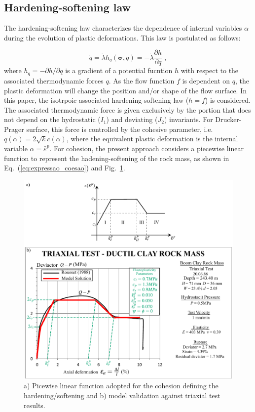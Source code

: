 \documentclass[Journal,letterpaper]{ascelike-new}
\newcommand{\hl}{{h_q}}
\newcommand{\strainpeq}{\bar \varepsilon^p}
\newcommand{\stress}{\boldsymbol{\sigma}}
\begin{document}
\subsection{Hardening-softening law}

The hardening-softening law characterizes the dependence of internal variables $\alpha$ during the evolution of plastic deformations. This law is postulated as follows:

\begin{equation} \label{eq_hardening_law}
	\dot q = \dot \lambda \hl(\stress,q) = - \dot \lambda \dfrac{\partial h}{\partial q}\;,
\end{equation}
where $\hl = -\partial h / \partial q$ is a gradient of a potential fucntion $h$ with respect to the associated thermodynamic forces $q$. As the flow function $f$ is dependent on $q$, the plastic deformation will change the position and/or shape of the flow surface. In this paper, the isotrpoic associated hardening-softening law ($h=f$) is considered. The associated thermodynamic force is given exclusively by the portion that does not depend on the hydrostatic ($I_1$) and deviating ($J_2$) invariants. For Drucker-Prager surface, this force is controlled by the cohesive parameter, i.e. $q(\alpha) =  2\sqrt{k}c(\alpha)$, where the equivalent plastic deformation is the internal variable $\alpha = \strainpeq$. For cohesion, the present approach considers a piecewise linear function to represent the hadening-softening of the rock mass, as shown in Eq.~(\ref{eq:expressao_coesao}) and Fig.~\ref{choesive parameter}.

\begin{figure}
	\centering
	\includegraphics[scale=1]{FIG1.pdf}
	\caption{a) Picewise linear function adopted for the cohesion defining the hardening/softening and b) model validation against triaxial test results.}
	\label{choesive parameter}
\end{figure}
\end{document}
